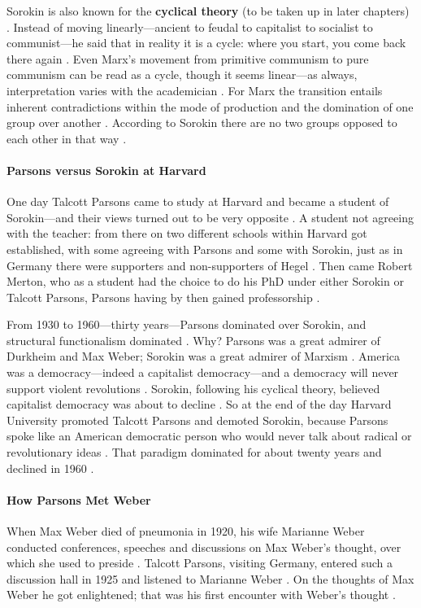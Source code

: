 \begin{KeyConcept}
Sorokin is also known for the \textbf{cyclical theory} (to be taken up in later chapters) . Instead of moving linearly---ancient to feudal to capitalist to socialist to communist---he said that in reality it is a cycle: where you start, you come back there again .
Even Marx's movement from primitive communism to pure communism can be read as a cycle, though it seems linear---as always, interpretation varies with the academician .
For Marx the transition entails inherent contradictions within the mode of production and the domination of one group over another . According to Sorokin there are no two groups opposed to each other in that way .
\end{KeyConcept}

\paragraph{Parsons versus Sorokin at Harvard}
One day Talcott Parsons came to study at Harvard and became a student of Sorokin---and their views turned out to be very opposite . A student not agreeing with the teacher: from there on two different schools within Harvard got established, with some agreeing with Parsons and some with Sorokin, just as in Germany there were supporters and non-supporters of Hegel .
Then came Robert Merton, who as a student had the choice to do his PhD under either Sorokin or Talcott Parsons, Parsons having by then gained professorship .

From 1930 to 1960---thirty years---Parsons dominated over Sorokin, and structural functionalism dominated .
Why? Parsons was a great admirer of Durkheim and Max Weber; Sorokin was a great admirer of Marxism . America was a democracy---indeed a capitalist democracy---and a democracy will never support violent revolutions . Sorokin, following his cyclical theory, believed capitalist democracy was about to decline . So at the end of the day Harvard University promoted Talcott Parsons and demoted Sorokin, because Parsons spoke like an American democratic person who would never talk about radical or revolutionary ideas .
That paradigm dominated for about twenty years and declined in 1960 .

\paragraph{How Parsons Met Weber}
When Max Weber died of pneumonia in 1920, his wife Marianne Weber conducted conferences, speeches and discussions on Max Weber's thought, over which she used to preside .
Talcott Parsons, visiting Germany, entered such a discussion hall in 1925 and listened to Marianne Weber . On the thoughts of Max Weber he got enlightened; that was his first encounter with Weber's thought .

